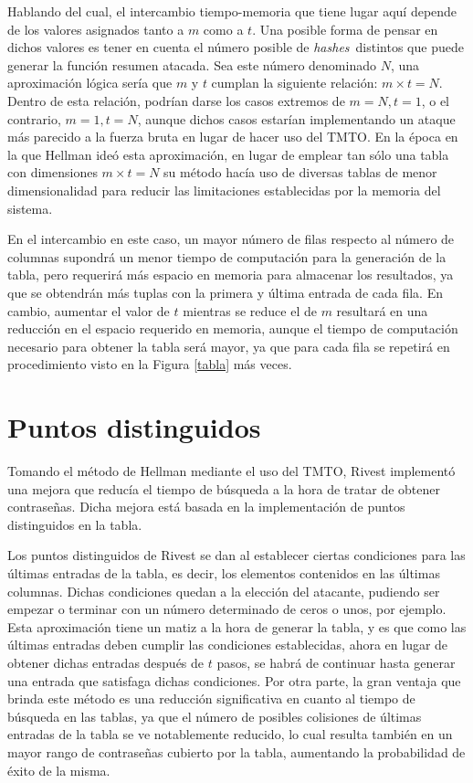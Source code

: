 \documentclass[12pt,spanish,listoffigures,listoftables]{tfgetsinf}
\newcommand{\hashes}{\textit{hashes}}
\begin{document}
Hablando del cual, el intercambio tiempo-memoria que tiene lugar aquí depende de los valores asignados tanto a $m$ como a $t$. Una posible forma de pensar en dichos valores es tener en cuenta el número posible de \hashes~distintos que puede generar la función resumen atacada. Sea este número denominado $N$, una aproximación lógica sería que $m$ y $t$ cumplan la siguiente relación: $m \times t = N$. Dentro de esta relación, podrían darse los casos extremos de $m = N, t = 1$, o el contrario, $m = 1, t = N$, aunque dichos casos estarían implementando un ataque más parecido a la fuerza bruta en lugar de hacer uso del TMTO. En la época en la que Hellman ideó esta aproximación, en lugar de emplear tan sólo una tabla con dimensiones $m \times t = N$ su método hacía uso de diversas tablas de menor dimensionalidad para reducir las limitaciones establecidas por la memoria del sistema.

En el intercambio en este caso, un mayor número de filas respecto al número de columnas supondrá un menor tiempo de computación para la generación de la tabla, pero requerirá más espacio en memoria para almacenar los resultados, ya que se obtendrán más tuplas con la primera y última entrada de cada fila. En cambio, aumentar el valor de $t$ mientras se reduce el de $m$ resultará en una reducción en el espacio requerido en memoria, aunque el tiempo de computación necesario para obtener la tabla será mayor, ya que para cada fila se repetirá en procedimiento visto en la Figura \ref{tabla} más veces.
~\\

\section{Puntos distinguidos}

Tomando el método de Hellman \cite{hellman} mediante el uso del TMTO, Rivest \cite{rivest} implementó una mejora que reducía el tiempo de búsqueda a la hora de tratar de obtener contraseñas. Dicha mejora está basada en la implementación de puntos distinguidos en la tabla.

Los puntos distinguidos de Rivest se dan al establecer ciertas condiciones para las últimas entradas de la tabla, es decir, los elementos contenidos en las últimas columnas. Dichas condiciones quedan a la elección del atacante, pudiendo ser empezar o terminar con un número determinado de ceros o unos, por ejemplo. Esta aproximación tiene un matiz a la hora de generar la tabla, y es que como las últimas entradas deben cumplir las condiciones establecidas, ahora en lugar de obtener dichas entradas después de $t$ pasos, se habrá de continuar hasta generar una entrada que satisfaga dichas condiciones. Por otra parte, la gran ventaja que brinda este método es una reducción significativa en cuanto al tiempo de búsqueda en las tablas, ya que el número de posibles colisiones de últimas entradas de la tabla se ve notablemente reducido, lo cual resulta también en un mayor rango de contraseñas cubierto por la tabla, aumentando la probabilidad de éxito de la misma.
\end{document}
